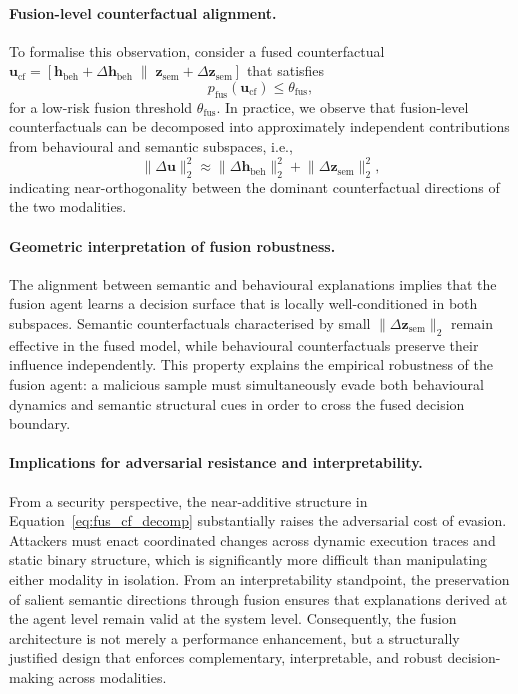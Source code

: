 \documentclass[3p]{elsarticle}
\begin{document}
\paragraph{Fusion-level counterfactual alignment.}
To formalise this observation, consider a fused counterfactual
$\mathbf{u}_{\mathrm{cf}} = [\mathbf{h}_{\mathrm{beh}} + \Delta \mathbf{h}_{\mathrm{beh}}
\;\|\; \mathbf{z}_{\mathrm{sem}} + \Delta \mathbf{z}_{\mathrm{sem}}]$
that satisfies
\begin{equation}
p_{\mathrm{fus}}(\mathbf{u}_{\mathrm{cf}}) \le \theta_{\mathrm{fus}},
\label{eq:fus_cf_condition}
\end{equation}
for a low-risk fusion threshold $\theta_{\mathrm{fus}}$.
In practice, we observe that fusion-level counterfactuals can be decomposed into
approximately independent contributions from behavioural and semantic subspaces, i.e.,
\begin{equation}
\lVert \Delta \mathbf{u} \rVert_2^2
\approx
\lVert \Delta \mathbf{h}_{\mathrm{beh}} \rVert_2^2
+
\lVert \Delta \mathbf{z}_{\mathrm{sem}} \rVert_2^2,
\label{eq:fus_cf_decomp}
\end{equation}
indicating near-orthogonality between the dominant counterfactual directions of the two
modalities.

\vspace{0.3em}
\paragraph{Geometric interpretation of fusion robustness.}
The alignment between semantic and behavioural explanations implies that the fusion agent
learns a decision surface that is locally well-conditioned in both subspaces.
Semantic counterfactuals characterised by small $\lVert \Delta \mathbf{z}_{\mathrm{sem}}
\rVert_2$ remain effective in the fused model, while behavioural counterfactuals preserve
their influence independently.
This property explains the empirical robustness of the fusion agent: a malicious sample
must simultaneously evade both behavioural dynamics and semantic structural cues in order
to cross the fused decision boundary.

\vspace{0.3em}
\paragraph{Implications for adversarial resistance and interpretability.}
From a security perspective, the near-additive structure in
Equation~\eqref{eq:fus_cf_decomp} substantially raises the adversarial cost of evasion.
Attackers must enact coordinated changes across dynamic execution traces and static
binary structure, which is significantly more difficult than manipulating either modality
in isolation.
From an interpretability standpoint, the preservation of salient semantic directions
through fusion ensures that explanations derived at the agent level remain valid at the
system level.
Consequently, the fusion architecture is not merely a performance enhancement, but a
structurally justified design that enforces complementary, interpretable, and robust
decision-making across modalities.
\end{document}
